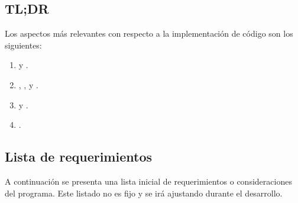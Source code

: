 \subsection*{TL;DR}
\noindent Los aspectos más relevantes con respecto a la implementación de código son los siguientes:

\begin{enumerate}
\item {} y .

\item {}, ,  y .

\item {} y .

\item {}.
\end{enumerate}

\subsection{Lista de requerimientos}\label{intro:lista-de-requerimientos}
A continuación se presenta una lista inicial de requerimientos o consideraciones del programa. Este listado no es fijo y se irá ajustando durante el desarrollo.

